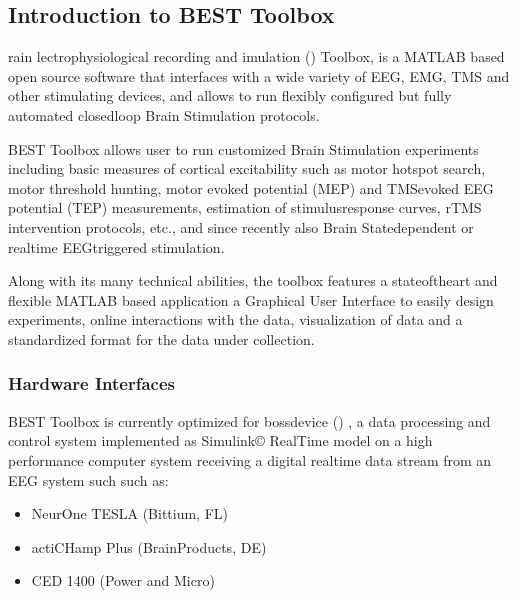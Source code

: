 \documentclass[letterpaper,10pt,english]{sphinxmanual}
\begin{document}
\subsection{Introduction to BEST Toolbox}
\label{\detokenize{1_Home:introduction-to-best-toolbox}}\label{\detokenize{1_Home::doc}}
\sphinxAtStartPar
{}rain lectrophysiological recording and imulation () Toolbox, is a MATLAB based open source software that interfaces with a wide variety of EEG, EMG, TMS and other stimulating devices, and allows to run flexibly configured but fully automated closed\sphinxhyphen{}loop Brain Stimulation protocols.

\sphinxAtStartPar
BEST Toolbox allows user to run customized Brain Stimulation experiments including basic measures of cortical excitability such as motor hotspot search, motor threshold hunting, motor evoked potential (MEP) and TMS\sphinxhyphen{}evoked EEG potential (TEP) measurements, estimation of stimulus\sphinxhyphen{}response curves, rTMS intervention protocols, etc., and since recently also Brain State\sphinxhyphen{}dependent or real\sphinxhyphen{}time EEG\sphinxhyphen{}triggered stimulation.

\sphinxAtStartPar
Along with its many technical abilities, the toolbox features a state\sphinxhyphen{}of\sphinxhyphen{}the\sphinxhyphen{}art and flexible MATLAB based application \textendash{} a Graphical User Interface to easily design experiments, online interactions with the data, visualization of data and a standardized format for the data under collection.


\subsubsection{Hardware Interfaces}
\label{\detokenize{1_Home:hardware-interfaces}}
\sphinxAtStartPar
BEST Toolbox is currently optimized for bossdevice  () , a data processing and control system implemented as Simulink© Real\sphinxhyphen{}Time model on a high performance computer system receiving a digital real\sphinxhyphen{}time data stream from an EEG system such such as:
\begin{itemize}
\item {} 
\sphinxAtStartPar
NeurOne TESLA (Bittium, FL)

\item {} 
\sphinxAtStartPar
actiCHamp Plus (BrainProducts, DE)

\item {} 
\sphinxAtStartPar
CED 1400 (Power and Micro)

\end{itemize}
\end{document}
